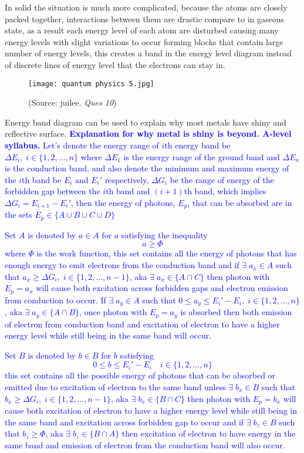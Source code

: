 \documentclass{article}
\begin{document}
 In solid the situation is much more complicated, because the atoms are closely packed together, interactions between them are drastic compare to in gaseous state, as a result each energy level of each atom are disturbed causing many energy  levels with slight variations to occur forming blocks that contain large number of energy levels, this creates a band in the energy level diagram instead of discrete lines of energy level that the electrons can stay in.
 \begin{figure}[H]
     \centering
     \captionsetup{justification=centering,margin=2cm}
     \texttt{[image: quantum physics 5.jpg]}
     \caption*{(Source: juilee. \textit{Ques 10})}
 \end{figure}
Energy band diagram can be used to explain why most metals have shiny and reflective surface.\textcolor{blue}{ \textbf{Explanation for why metal is shiny is beyond. A-level syllabus.} Let's denote the energy range of $i$th energy band be $\Delta E_i,\; i\in\{1,2,\dots,n\}$ where $\Delta E_1$ is the energy range of the ground band and $\Delta E_n$ is the conduction band, and also denote the minimum and maximum energy of the $i$th band be $E_i$ and ${E_i}'$ respectively, $\Delta G_i$ be the range of energy of the forbidden gap between the $i$th band and $(i+1)$th band, which implies $\Delta G_i= E_{i+1}-{E_i}'$, then the energy of photons, $E_p$, that can be absorbed are in the sets $E_p \in \{ A \cup B \cup  C \cup D\} $}

\textcolor{blue}{Set $A$ is denoted by $a\in A$ for $a$ satisfying the inequality 
$$a \geq \Phi$$
where $\Phi$ is the work function, this set contains all the energy of photons that has enough energy to emit electrons from the conduction band and if $ \exists \; a_x \in A$ such that $a_x \geq \Delta G_i,\; i\in \{1,2,\dots,n-1\}$, aka $\exists \; a_x\in \{A \cap C\}$ then photon with $E_p=a_x$ will cause both excitation across forbidden gaps and electron emission from conduction to occur. If  $\exists \; a_y\in A $ such that  $0\leq a_y \leq {E_i}'-E_i,\; i\in \{1,2,\dots,n\}$, aka $\exists \; a_y\in\{A \cap B\}$, once photon with $E_p=a_y$ is absorbed then both emission of electron from conduction band and excitation of electron to have a higher energy level while still being in the same band will occur.}

\textcolor{blue}{Set $B$ is denoted by $b\in B$ for $b$ satisfying
$$0\leq b\leq {E_i}'-E_i \quad i\in \{1,2,\dots,n\}$$
this set contains all the possible energy of photons that can be absorbed or emitted due to excitation of electron to the same band unless $\exists \; b_x\in B$ such that $b_x\geq \Delta G_i, \; i\in \{1,2,\dots, n-1\}$, aka $\exists \; b_x\in \{B\cap C\}$ then photon with $E_p=b_x$ will cause both excitation of electron to have a higher energy level while still being in the same band and excitation across forbidden gap to occur and if $\exists \; b_z\in B $ such that  $b_z \geq \Phi$, aka $\exists \; b_z\in \{B\cap A\}$ then excitation of electron to have energy in the same band and emission of electron from the conduction band will also occur.}
\end{document}
